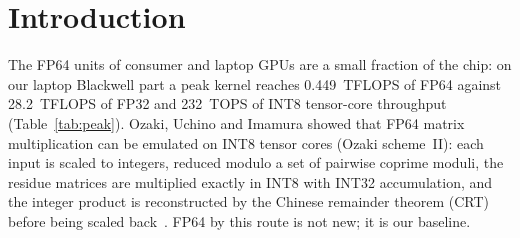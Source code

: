 \documentclass[11pt]{article}
\begin{document}
\section{Introduction}
The FP64 units of consumer and laptop GPUs are a small fraction of the chip: on our laptop Blackwell part a peak kernel
reaches 0.449~TFLOPS of FP64 against 28.2~TFLOPS of FP32 and 232~TOPS of INT8 tensor-core throughput (Table~\ref{tab:peak}).
Ozaki, Uchino and Imamura showed that FP64 matrix multiplication can be emulated on INT8 tensor cores (Ozaki scheme~II):
each input is scaled to integers, reduced modulo a set of pairwise coprime moduli, the residue matrices are multiplied
exactly in INT8 with INT32 accumulation, and the integer product is reconstructed by the Chinese remainder theorem (CRT)
before being scaled back~\cite{ozaki2}. FP64 by this route is not new; it is our baseline.
\end{document}
